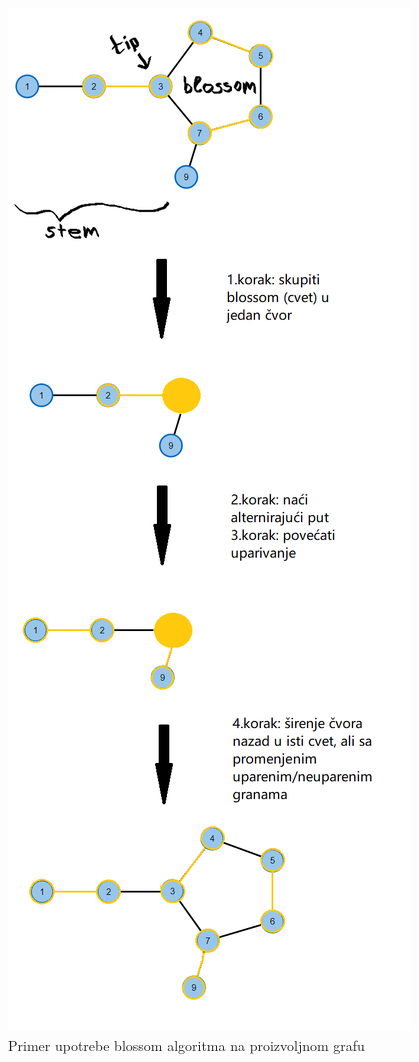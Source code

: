\documentclass[11pt,a4paper]{article}
\theoremstyle{definition}
\begin{document}
\begin{figure}[H]
\begin{center}
\includegraphics[scale=0.52]{Screenshot (363).png}
\end{center}
\caption{Primer upotrebe blossom algoritma na proizvoljnom grafu}
\label{fig:slika 44}
\end{figure}
\end{document}
